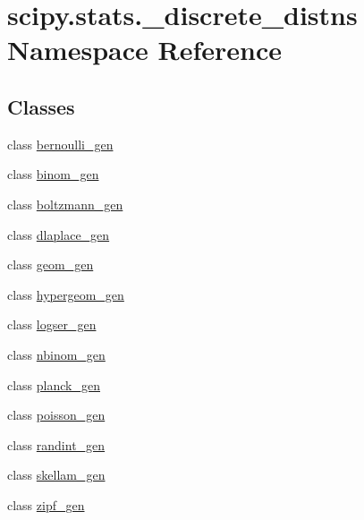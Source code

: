 \hypertarget{namespacescipy_1_1stats_1_1__discrete__distns}{}\section{scipy.\+stats.\+\_\+discrete\+\_\+distns Namespace Reference}
\label{namespacescipy_1_1stats_1_1__discrete__distns}
\subsection*{Classes}
\begin{DoxyCompactItemize}
\item 
class \hyperlink{classscipy_1_1stats_1_1__discrete__distns_1_1bernoulli__gen}{bernoulli\+\_\+gen}
\item 
class \hyperlink{classscipy_1_1stats_1_1__discrete__distns_1_1binom__gen}{binom\+\_\+gen}
\item 
class \hyperlink{classscipy_1_1stats_1_1__discrete__distns_1_1boltzmann__gen}{boltzmann\+\_\+gen}
\item 
class \hyperlink{classscipy_1_1stats_1_1__discrete__distns_1_1dlaplace__gen}{dlaplace\+\_\+gen}
\item 
class \hyperlink{classscipy_1_1stats_1_1__discrete__distns_1_1geom__gen}{geom\+\_\+gen}
\item 
class \hyperlink{classscipy_1_1stats_1_1__discrete__distns_1_1hypergeom__gen}{hypergeom\+\_\+gen}
\item 
class \hyperlink{classscipy_1_1stats_1_1__discrete__distns_1_1logser__gen}{logser\+\_\+gen}
\item 
class \hyperlink{classscipy_1_1stats_1_1__discrete__distns_1_1nbinom__gen}{nbinom\+\_\+gen}
\item 
class \hyperlink{classscipy_1_1stats_1_1__discrete__distns_1_1planck__gen}{planck\+\_\+gen}
\item 
class \hyperlink{classscipy_1_1stats_1_1__discrete__distns_1_1poisson__gen}{poisson\+\_\+gen}
\item 
class \hyperlink{classscipy_1_1stats_1_1__discrete__distns_1_1randint__gen}{randint\+\_\+gen}
\item 
class \hyperlink{classscipy_1_1stats_1_1__discrete__distns_1_1skellam__gen}{skellam\+\_\+gen}
\item 
class \hyperlink{classscipy_1_1stats_1_1__discrete__distns_1_1zipf__gen}{zipf\+\_\+gen}
\end{DoxyCompactItemize}
